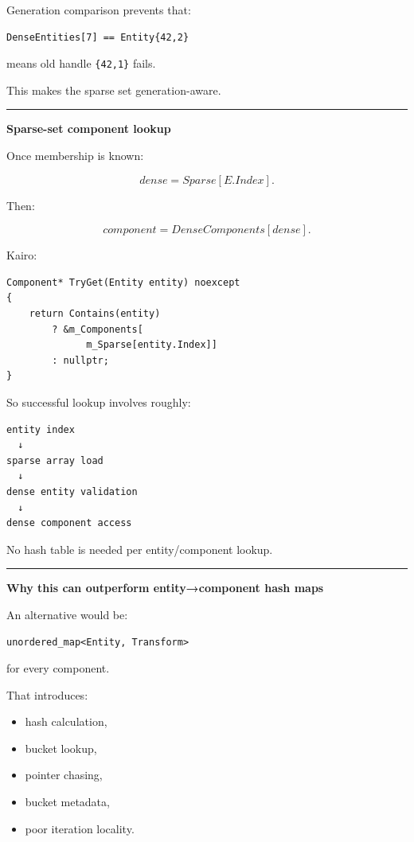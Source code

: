 Generation comparison prevents that:

\begin{verbatim}
DenseEntities[7] == Entity{42,2}
\end{verbatim}

means old handle \texttt{\{42,1\}} fails.

This makes the sparse set generation-aware.

\begin{center}\rule{0.5\linewidth}{0.5pt}\end{center}

\textbf{Sparse-set component lookup}

Once membership is known:

\[
dense=Sparse[E.Index].
\]

Then:

\[
component=DenseComponents[dense].
\]

Kairo:

\begin{verbatim}
Component* TryGet(Entity entity) noexcept
{
    return Contains(entity)
        ? &m_Components[
              m_Sparse[entity.Index]]
        : nullptr;
}
\end{verbatim}

So successful lookup involves roughly:

\begin{verbatim}
entity index
  ↓
sparse array load
  ↓
dense entity validation
  ↓
dense component access
\end{verbatim}

No hash table is needed per entity/component lookup.

\begin{center}\rule{0.5\linewidth}{0.5pt}\end{center}

\textbf{Why this can outperform entity→component hash maps}

An alternative would be:

\begin{verbatim}
unordered_map<Entity, Transform>
\end{verbatim}

for every component.

That introduces:

\begin{itemize}
\tightlist
\item
  hash calculation,
\item
  bucket lookup,
\item
  pointer chasing,
\item
  bucket metadata,
\item
  poor iteration locality.
\end{itemize}

